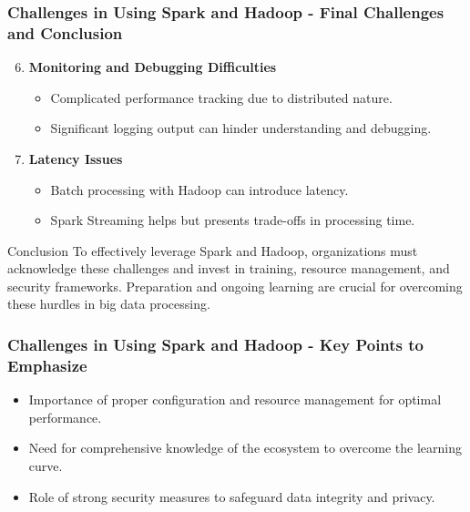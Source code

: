 \documentclass{beamer}
\begin{document}
\begin{frame}[fragile]
    \frametitle{Challenges in Using Spark and Hadoop - Final Challenges and Conclusion}
    \begin{enumerate}
        \setcounter{enumi}{5} %
        \item \textbf{Monitoring and Debugging Difficulties}
            \begin{itemize}
                \item Complicated performance tracking due to distributed nature.
                \item Significant logging output can hinder understanding and debugging.
            \end{itemize}
        \item \textbf{Latency Issues}
            \begin{itemize}
                \item Batch processing with Hadoop can introduce latency.
                \item Spark Streaming helps but presents trade-offs in processing time.
            \end{itemize}
    \end{enumerate}
    
    \begin{block}{Conclusion}
        To effectively leverage Spark and Hadoop, organizations must acknowledge these challenges and invest in training, resource management, and security frameworks. Preparation and ongoing learning are crucial for overcoming these hurdles in big data processing.
    \end{block}
\end{frame}

\begin{frame}[fragile]
    \frametitle{Challenges in Using Spark and Hadoop - Key Points to Emphasize}
    \begin{itemize}
        \item Importance of proper configuration and resource management for optimal performance.
        \item Need for comprehensive knowledge of the ecosystem to overcome the learning curve.
        \item Role of strong security measures to safeguard data integrity and privacy.
    \end{itemize}
\end{frame}
\end{document}

